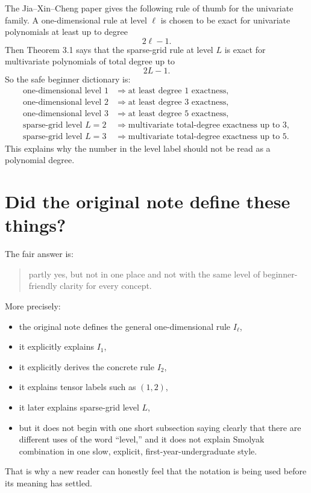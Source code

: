 \documentclass[11pt]{article}
\begin{document}
The Jia--Xin--Cheng paper gives the following rule of thumb for the univariate
family.  A one-dimensional rule at level \(\ell\) is chosen to be exact for
univariate polynomials at least up to degree
\begin{equation}
  2\ell-1.
  \label{eq:2lminus1-univariate}
\end{equation}
Then Theorem 3.1 says that the sparse-grid rule at level \(L\) is exact for
multivariate polynomials of total degree up to
\begin{equation}
  2L-1.
  \label{eq:2Lminus1-multivariate}
\end{equation}
So the safe beginner dictionary is:
\begin{align*}
  \text{one-dimensional level 1} &\Rightarrow \text{at least degree 1 exactness},\\
  \text{one-dimensional level 2} &\Rightarrow \text{at least degree 3 exactness},\\
  \text{one-dimensional level 3} &\Rightarrow \text{at least degree 5 exactness},\\
  \text{sparse-grid level }L=2 &\Rightarrow \text{multivariate total-degree exactness up to 3},\\
  \text{sparse-grid level }L=3 &\Rightarrow \text{multivariate total-degree exactness up to 5}.
\end{align*}
This explains why the number in the level label should not be read as a
polynomial degree.

\section{Did the original note define these things?}
\label{sec:did-original-note-define}

The fair answer is:
\begin{quote}
partly yes, but not in one place and not with the same level of beginner-friendly
clarity for every concept.
\end{quote}

More precisely:
\begin{itemize}[leftmargin=0.28in]
  \item the original note defines the general one-dimensional rule \(I_\ell\),
  \item it explicitly explains \(I_1\),
  \item it explicitly derives the concrete rule \(I_2\),
  \item it explains tensor labels such as \((1,2)\),
  \item it later explains sparse-grid level \(L\),
  \item but it does not begin with one short subsection saying clearly that
  there are different uses of the word ``level,'' and it does not explain
  Smolyak combination in one slow, explicit, first-year-undergraduate style.
\end{itemize}
That is why a new reader can honestly feel that the notation is being used before
its meaning has settled.
\end{document}
